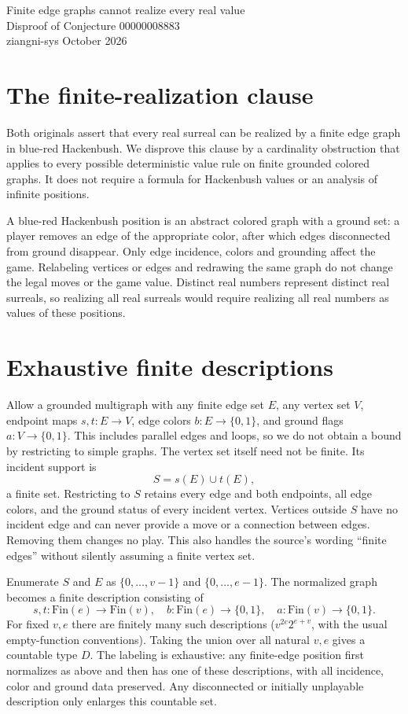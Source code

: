\documentclass[10pt,a4paper]{article}
\begin{document}
\begin{center}
{\Large Finite edge graphs cannot realize every real value}\\[4pt]
{\large Disproof of Conjecture 00000008883}\\[6pt]
ziangni-sys  October 2026
\end{center}
\section*{The finite-realization clause}
Both originals assert that every real surreal can be realized by a
finite edge graph in blue-red Hackenbush. We disprove this clause by a
cardinality obstruction that applies to every possible deterministic
value rule on finite grounded colored graphs. It does not require a
formula for Hackenbush values or an analysis of infinite positions.

A blue-red Hackenbush position is an abstract colored graph with a
ground set: a player removes an edge of the appropriate color, after
which edges disconnected from ground disappear. Only edge incidence,
colors and grounding affect the game. Relabeling vertices or edges and
redrawing the same graph do not change the legal moves or the game
value. Distinct real numbers represent distinct real surreals, so
realizing all real surreals would require realizing all real numbers as
values of these positions.

\section*{Exhaustive finite descriptions}
Allow a grounded multigraph with any finite edge set $E$, any vertex
set $V$, endpoint maps $s,t:E\to V$, edge colors $b:E\to\{0,1\}$,
and ground flags $a:V\to\{0,1\}$. This includes parallel edges and
loops, so we do not obtain a bound by restricting to simple graphs.
The vertex set itself need not be finite. Its incident support is
\[
 S=s(E)\cup t(E),
\]
a finite set. Restricting to $S$ retains every edge and both endpoints,
all edge colors, and the ground status of every incident vertex.
Vertices outside $S$ have no incident edge and can never provide a
move or a connection between edges. Removing them changes no play.
This also handles the source's wording ``finite edges'' without silently
assuming a finite vertex set.

Enumerate $S$ and $E$ as $\{0,\ldots,v-1\}$ and
$\{0,\ldots,e-1\}$. The normalized graph becomes a finite description
consisting of
\[
 s,t:\mathrm{Fin}(e)\to\mathrm{Fin}(v),\quad
 b:\mathrm{Fin}(e)\to\{0,1\},\quad
 a:\mathrm{Fin}(v)\to\{0,1\}.
\]
For fixed $v,e$ there are finitely many such descriptions
($v^{2e}2^{e+v}$, with the usual empty-function conventions).
Taking the union over all natural $v,e$ gives a countable type $D$.
The labeling is exhaustive: any finite-edge position first normalizes
as above and then has one of these descriptions, with all incidence,
color and ground data preserved. Any disconnected or initially
unplayable description only enlarges this countable set.
\end{document}
